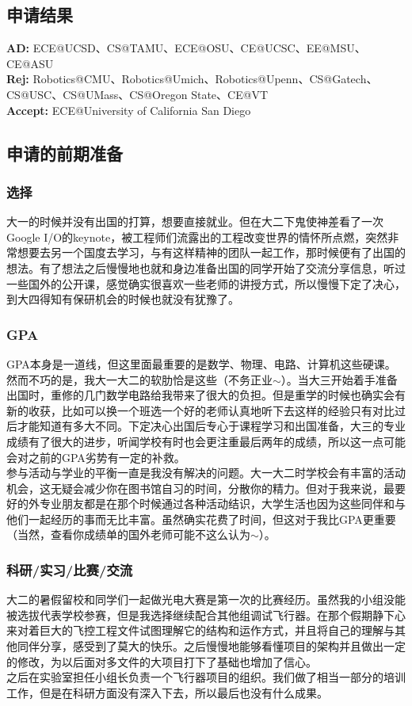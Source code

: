 \documentclass[a4paper,UTF8]{book}
\begin{document}
    \subsection*{申请结果}
        \textbf{AD:} ECE@UCSD、CS@TAMU、ECE@OSU、CE@UCSC、EE@MSU、CE@ASU \\
        \textbf{Rej:} Robotics@CMU、Robotics@Umich、Robotics@Upenn、CS@Gatech、CS@USC、CS@UMass、CS@Oregon State、CE@VT\\
        \textbf{Accept:} ECE@University of California San Diego

    \subsection*{申请的前期准备}
        \subsubsection*{选择}
        大一的时候并没有出国的打算，想要直接就业。但在大二下鬼使神差看了一次Google I/O的keynote，被工程师们流露出的工程改变世界的情怀所点燃，突然非常想要去另一个国度去学习，与有这样精神的团队一起工作，那时候便有了出国的想法。有了想法之后慢慢地也就和身边准备出国的同学开始了交流分享信息，听过一些国外的公开课，感觉确实很喜欢一些老师的讲授方式，所以慢慢下定了决心，到大四得知有保研机会的时候也就没有犹豫了。
        \subsubsection*{GPA}
        GPA本身是一道线，但这里面最重要的是数学、物理、电路、计算机这些硬课。然而不巧的是，我大一大二的软肋恰是这些（不务正业$\sim$）。当大三开始着手准备出国时，重修的几门数学电路给我带来了很大的负担。但是重学的时候也确实会有新的收获，比如可以换一个班选一个好的老师认真地听下去这样的经验只有对比过后才能知道有多大不同。下定决心出国后专心于课程学习和出国准备，大三的专业成绩有了很大的进步，听闻学校有时也会更注重最后两年的成绩，所以这一点可能会对之前的GPA劣势有一定的补救。\\
        参与活动与学业的平衡一直是我没有解决的问题。大一大二时学校会有丰富的活动机会，这无疑会减少你在图书馆自习的时间，分散你的精力。但对于我来说，最要好的外专业朋友都是在那个时候通过各种活动结识，大学生活也因为这些同伴和与他们一起经历的事而无比丰富。虽然确实花费了时间，但这对于我比GPA更重要（当然，查看你成绩单的国外老师可能不这么认为$\sim$）。

        \subsubsection*{科研/实习/比赛/交流}
        大二的暑假留校和同学们一起做光电大赛是第一次的比赛经历。虽然我的小组没能被选拔代表学校参赛，但是我选择继续配合其他组调试飞行器。在那个假期静下心来对着巨大的飞控工程文件试图理解它的结构和运作方式，并且将自己的理解与其他同伴分享，感受到了莫大的快乐。之后慢慢地能够看懂项目的架构并且做出一定的修改，为以后面对多文件的大项目打下了基础也增加了信心。\\
        之后在实验室担任小组长负责一个飞行器项目的组织。我们做了相当一部分的培训工作，但是在科研方面没有深入下去，所以最后也没有什么成果。
\end{document}
